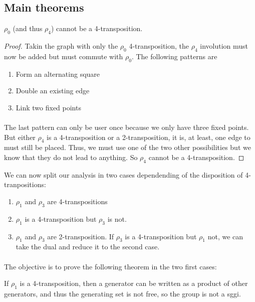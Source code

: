 \subsection{Main theorems}

\begin{lemma}
  $\rho_0$ (and thus $\rho_4$) cannot be a 4-transposition.
\end{lemma}

\begin{proof}
  Takin the graph with only the $\rho_0$ 4-transposition, the $\rho_4$ involution must now be added but must commute with $\rho_0$. The following patterns are
  \begin{enumerate}
    \item Form an alternating square
    \item Double an existing edge
    \item Link two fixed points
  \end{enumerate}

  \paragraph{}
  The last pattern can only be user once because we only have three fixed points. But either $\rho_4$ is a 4-transposition or a 2-transposition, it is, at least, one edge to must still be placed. Thus, we must use one of the two other possibilities but we know that they do not lead to anything. So $\rho_4$ cannot be a 4-transposition.

\end{proof}

We can now split our analysis in two cases dependending of the disposition of 4-tranpositions:
\begin{enumerate}
  \item $\rho_1$ and $\rho_3$ are 4-transpositions
  \item $\rho_1$ is a 4-transposition but $\rho_3$ is not.
  \item $\rho_1$ and $\rho_3$ are 2-transposition. If $\rho_3$ is a 4-transposition but $\rho_1$ not, we can take the dual and reduce it to the second case.
\end{enumerate}

\paragraph{}
The objective is to prove the following theorem in the two first cases:
\begin{theorem}
  If $\rho_1$ is a 4-transposition, then a generator can be written as a product of other generators, and thus the generating set is not free, so the group is not a sggi.
\end{theorem}


